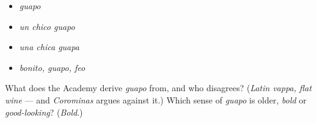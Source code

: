 \begin{itemize}
\raggedright
  \item \emph{guapo}
  \item \emph{un chico guapo}
  \item \emph{una chica guapa}
  \item \emph{bonito, guapo, feo}
\end{itemize}

\begin{tcolorbox}[breakable,colback=teal!4,colframe=teal!35!black,title={Before you move on}]
What does the Academy derive \emph{guapo} from, and who disagrees? (\emph{Latin vappa, flat wine} — and \emph{Corominas} argues against it.) Which sense of \emph{guapo} is older, \emph{bold} or \emph{good-looking}? (\emph{Bold}.)
\end{tcolorbox}
